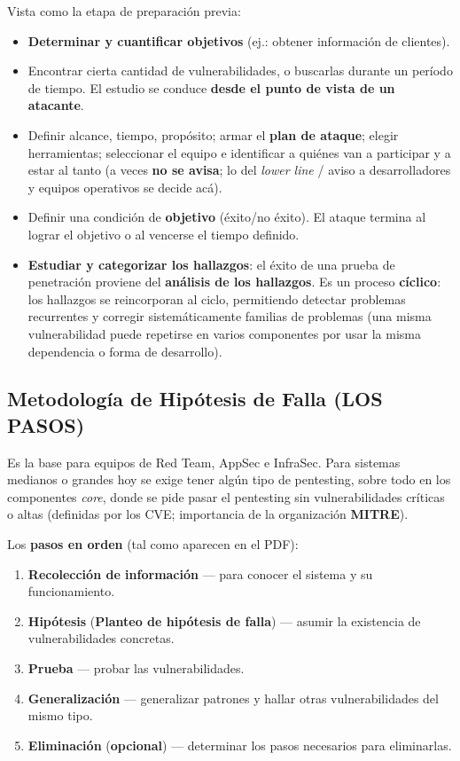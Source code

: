 \documentclass[../main.tex]{subfiles}
\begin{document}
Vista como la etapa de preparación previa:
\begin{itemize}
    \item \textbf{Determinar y cuantificar objetivos} (ej.: obtener información de clientes).
    \item Encontrar cierta cantidad de vulnerabilidades, o buscarlas durante un período de
    tiempo. El estudio se conduce \textbf{desde el punto de vista de un atacante}.
    \item Definir alcance, tiempo, propósito; armar el \textbf{plan de ataque}; elegir
    herramientas; seleccionar el equipo e identificar a quiénes van a participar y a estar
    al tanto (a veces \textbf{no se avisa}; lo del \emph{lower line} / aviso a desarrolladores
    y equipos operativos se decide acá).
    \item Definir una condición de \textbf{objetivo} (éxito/no éxito). El ataque termina al
    lograr el objetivo o al vencerse el tiempo definido.
    \item \textbf{Estudiar y categorizar los hallazgos}: el éxito de una prueba de penetración
    proviene del \textbf{análisis de los hallazgos}. Es un proceso \textbf{cíclico}: los
    hallazgos se reincorporan al ciclo, permitiendo detectar problemas recurrentes y corregir
    sistemáticamente familias de problemas (una misma vulnerabilidad puede repetirse en
    varios componentes por usar la misma dependencia o forma de desarrollo).
\end{itemize}

\subsection{Metodología de Hipótesis de Falla (LOS PASOS)}

\begin{destacado}
 Es la base para equipos de Red Team, AppSec e
InfraSec. Para sistemas medianos o grandes hoy se exige tener algún tipo de pentesting,
sobre todo en los componentes \emph{core}, donde se pide pasar el pentesting sin
vulnerabilidades críticas o altas (definidas por los CVE; importancia de la organización
\textbf{MITRE}).
\end{destacado}

Los \textbf{pasos en orden} (tal como aparecen en el PDF):

\begin{enumerate}
    \item \textbf{Recolección de información} --- para conocer el sistema y su funcionamiento.
    \item \textbf{Hipótesis} (\textbf{Planteo de hipótesis de falla}) --- asumir la existencia
    de vulnerabilidades concretas.
    \item \textbf{Prueba} --- probar las vulnerabilidades.
    \item \textbf{Generalización} --- generalizar patrones y hallar otras vulnerabilidades del
    mismo tipo.
    \item \textbf{Eliminación} (\textbf{opcional}) --- determinar los pasos necesarios para
    eliminarlas.
\end{enumerate}
\end{document}
